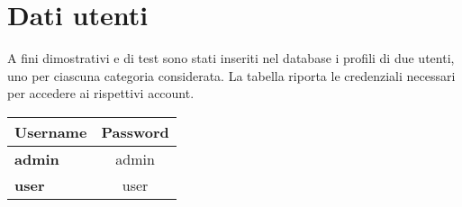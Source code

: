 \appendix
\section{Dati utenti}
\label{dati-utenti}
A fini dimostrativi e di test sono stati inseriti nel database i profili di due utenti, uno per ciascuna categoria considerata. La tabella riporta le credenziali necessari per accedere ai rispettivi account.

\begin{center}
		\begin{tabular}{ | l | c | } \hline
				\textbf{Username} 	& \textbf{Password} \\ \hline 
		 		\textbf{admin} 				& admin \\ 
		 		\textbf{user}					& user \\  \hline
		\end{tabular}
\end{center}